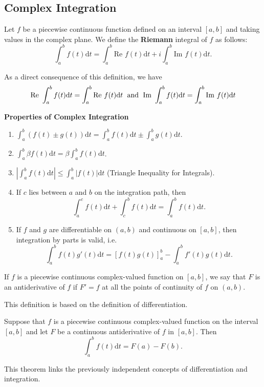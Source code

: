 \subsection{Complex Integration}
\begin{defn}
Let $f$ be a piecewise continuous function defined on an interval
$[a,b]$ and taking values in the complex plane. We define the \textbf{Riemann} integral of $f$
as follows:
$$\int_a^b f(t) \mathrm{d}t = \int_a^b\mbox{Re }f(t)\mathrm{d}t + i \int_a^b\mbox{Im }f(t)\mathrm{d}t.$$
\end{defn}
As a direct consequence of this definition, we have
$$\mbox{Re }\int_a^b f(t) \mathrm{d}t = \int_a^b\mbox{Re }f(t)\mathrm{d}t \hspace{0.5pc} \mbox{and} \hspace{0.5pc} \mbox{Im }\int_a^b f(t) \mathrm{d}t = \int_a^b\mbox{Im }f(t)\mathrm{d}t$$

\medskip

\textbf{Properties of Complex Integration}
\begin{enumerate}
    \item $\displaystyle\int_a^b (f(t) \pm g(t)) \mathrm{d}t = \int_a^b f(t) \mathrm{d}t \pm \int_a^b g(t) \mathrm{d}t$.
    \item $\displaystyle\int_a^b \beta f(t) \mathrm{d}t = \beta\int_a^b f(t) \mathrm{d}t$.
    \item $\displaystyle\left|\int_a^b f(t) \mathrm{d}t\right| \leq \int_a^b |f(t)| \mathrm{d}t$ (Triangle Inequality for Integrals).
	\item If $c$ lies between $a$ and $b$ on the integration path, then $$\int_a^c f(t) \mathrm{d}t + \int_c^b f(t) \mathrm{d}t = \int_a^b f(t) \mathrm{d}t.$$
    \item If $f$ and $g$ are differentiable on $(a,b)$ and continuous on $[a,b]$, then integration by parts is valid, i.e. $$\int_a^b f(t)g'(t)\mathrm{d}t = \left[ f(t)g(t)\right]_a^b - \int_a^b f'(t)g(t)\mathrm{d}t.$$
\end{enumerate}

\begin{defn}[Antiderivative]
If $f$ is a piecewise continuous complex-valued function on $[a,b]$,
we say that $F$ is an antiderivative of $f$ if $F' = f$ at all the points of continuity of $f$ on $(a,b)$.
\end{defn}
This definition is based on the definition of differentiation.

\begin{thm}
Suppose that $f$ is a piecewise
continuous complex-valued function on the interval $[a, b]$ and let $F$ be a continuous antiderivative of $f$ in $[a, b]$. Then
$$\int_a^b f(t) \mathrm{d}t = F(a) - F(b).$$
\end{thm}
This theorem links the previously independent concepts of differentiation and integration.

